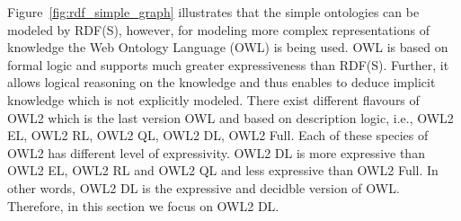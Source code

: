 
Figure~\ref{fig:rdf_simple_graph} illustrates that the simple ontologies can be modeled by RDF(S), however, for modeling more complex representations of knowledge the Web Ontology Language (OWL) is being used. OWL is based on formal logic and supports much greater expressiveness than RDF(S). Further, it allows logical reasoning on the knowledge and thus enables to deduce implicit knowledge which is not explicitly modeled. There exist different flavours of OWL2 which is the last version OWL and based on description logic, i.e., OWL2 EL, OWL2 RL, OWL2 QL, OWL2 DL, OWL2 Full. Each of these species of OWL2 has different level of expressivity. OWL2 DL is more expressive than OWL2 EL, OWL2 RL and OWL2 QL and less expressive than OWL2 Full.
In other words, OWL2 DL is the expressive and decidble version of OWL. Therefore, in this section we focus on OWL2 DL.

